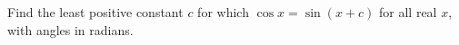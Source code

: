 Find the least positive constant $c$ for which $\cos x=\sin(x+c)$ for all real $x$, with angles in radians.
